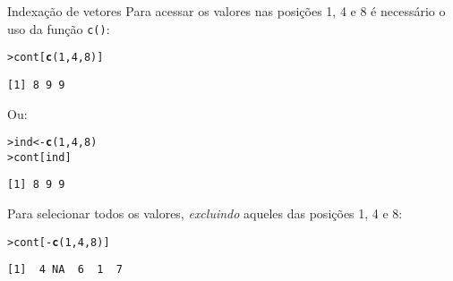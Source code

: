 \documentclass[10pt,handout]{beamer}\usepackage{graphicx, color}
\makeatletter
\newcommand{\hlfunctioncall}[1]{\textcolor[rgb]{0,0,0.545098039215686}{\textbf{#1}}}%
\newenvironment{kframe}{%
 \def\at@end@of@kframe{}%
 \ifinner\ifhmode%
  \def\at@end@of@kframe{\end{minipage}}%
  \begin{minipage}{\columnwidth}%
 \fi\fi%
 \def\FrameCommand##1{\hskip\@totalleftmargin \hskip-\fboxsep
 \colorbox{shadecolor}{##1}\hskip-\fboxsep
     \hskip-\linewidth \hskip-\@totalleftmargin \hskip\columnwidth}%
 \MakeFramed {\advance\hsize-\width
   \@totalleftmargin\z@ \linewidth\hsize
   \@setminipage}}%
 {\par\unskip\endMakeFramed%
 \at@end@of@kframe}
\newenvironment{knitrout}{}{} %
\makeatother
\begin{document}
\begin{frame}[fragile=singleslide]{Indexação de vetores}
Para acessar os valores nas posições 1, 4 e 8 é necessário o uso da
função \texttt{c()}:
\begin{knitrout}\small
{}\color{fgcolor}\begin{kframe}
\begin{alltt}
> cont[\hlfunctioncall{c}(1, 4, 8)]
\end{alltt}
\begin{verbatim}
[1] 8 9 9
\end{verbatim}
\end{kframe}
\end{knitrout}

Ou:
\begin{knitrout}\small
{}\color{fgcolor}\begin{kframe}
\begin{alltt}
> ind <- \hlfunctioncall{c}(1, 4, 8)
> cont[ind]
\end{alltt}
\begin{verbatim}
[1] 8 9 9
\end{verbatim}
\end{kframe}
\end{knitrout}

Para selecionar todos os valores, \emph{excluindo} aqueles das posições
1, 4 e 8:
\begin{knitrout}\small
{}\color{fgcolor}\begin{kframe}
\begin{alltt}
> cont[-\hlfunctioncall{c}(1, 4, 8)]
\end{alltt}
\begin{verbatim}
[1]  4 NA  6  1  7
\end{verbatim}
\end{kframe}
\end{knitrout}

\end{frame}
\end{document}
